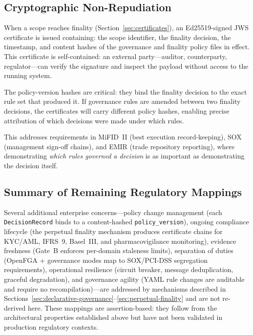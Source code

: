 \documentclass[11pt]{article}
\begin{document}
\subsection{Cryptographic Non-Repudiation}

When a scope reaches finality (Section~\ref{sec:certificates}), an Ed25519-signed JWS certificate is issued containing: the scope identifier, the finality decision, the timestamp, and content hashes of the governance and finality policy files in effect. This certificate is self-contained: an external party---auditor, counterparty, regulator---can verify the signature and inspect the payload without access to the running system.

The policy-version hashes are critical: they bind the finality decision to the exact rule set that produced it. If governance rules are amended between two finality decisions, the certificates will carry different policy hashes, enabling precise attribution of which decisions were made under which rules.

This addresses requirements in MiFID~II (best execution record-keeping), SOX (management sign-off chains), and EMIR (trade repository reporting), where demonstrating \emph{which rules governed a decision} is as important as demonstrating the decision itself.

\subsection{Summary of Remaining Regulatory Mappings}

Several additional enterprise concerns---policy change management (each \texttt{DecisionRecord} binds to a content-hashed \texttt{policy\_version}), ongoing compliance lifecycle (the perpetual finality mechanism produces certificate chains for KYC/AML, IFRS~9, Basel~III, and pharmacovigilance monitoring), evidence freshness (Gate~B enforces per-domain staleness limits), separation of duties (OpenFGA + governance modes map to SOX/PCI-DSS segregation requirements), operational resilience (circuit breaker, message deduplication, graceful degradation), and governance agility (YAML rule changes are auditable and require no recompilation)---are addressed by mechanisms described in Sections~\ref{sec:declarative-governance}--\ref{sec:perpetual-finality} and are not re-derived here. These mappings are assertion-based: they follow from the architectural properties established above but have not been validated in production regulatory contexts.
\end{document}
